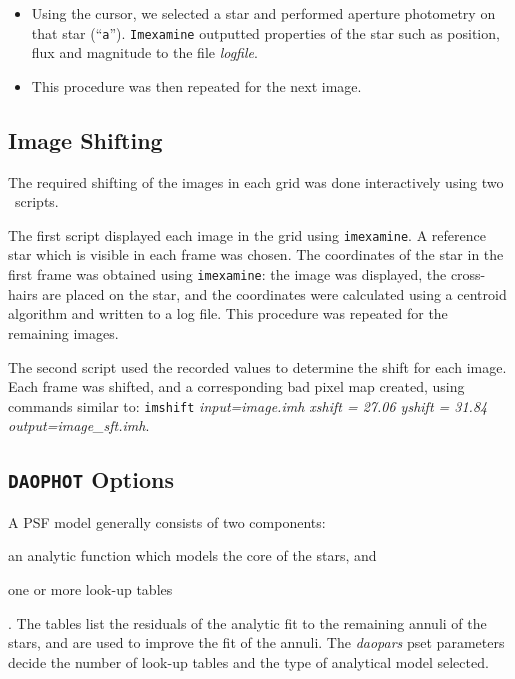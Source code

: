 \begin{itemize}
\begin{description}
    \end{description}

\item
Using the cursor, we selected a star and performed aperture photometry
on that star (``\texttt{a}''). \texttt{Imexamine} outputted properties
of the star such as position, flux and magnitude to the file
\textit{logfile}. %

\item
This procedure was then repeated for the next image. %

\end{itemize}


\subsection{Image Shifting}\label{cha:IRAF:sec:Photometry:subsec:Imshift}

The required shifting of the images in each grid was done
interactively using two \iraf\ scripts. %

\vspace{\myparskip}

The first script displayed each image in the grid using
\texttt{imexamine}. A reference star which is visible in each frame was
chosen. The coordinates of the star in the first frame was obtained
using \texttt{imexamine}: the image was displayed, the cross-hairs
are placed on the star, and the coordinates were calculated using a
centroid algorithm and written to a log file. This procedure was
repeated for the remaining images. %

\vspace{\myparskip}

The second script used the recorded values to determine the shift for
each image. Each frame was shifted, and a corresponding bad pixel map
created, using commands similar to: \texttt{imshift}
\textit{input=image.imh xshift = 27.06 yshift = 31.84
output=image\_sft.imh}. %


\subsection{\texttt{DAOPHOT} Options}\label{cha:IRAF:sec:Photometry:subsec:DAOPHOTOptions}

A PSF model generally consists of two components:
\begin{inparaenum}[(i)]
\item
an analytic function which models the core of the stars, and
\item
one or more look-up tables
\end{inparaenum}
. The tables list the residuals of the analytic fit to the remaining
annuli of the stars, and are used to improve the fit of the annuli. The
\textit{daopars} pset parameters decide the number of look-up tables
and the type of analytical model selected. %

